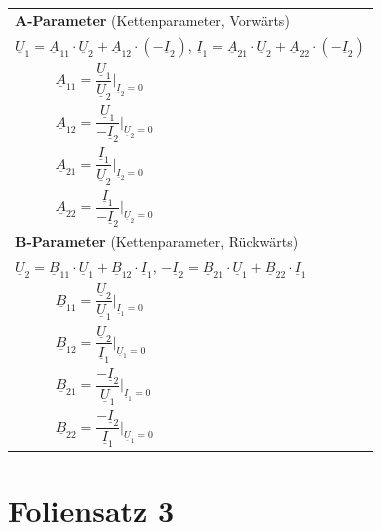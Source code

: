 \documentclass[a4paper,12pt]{scrartcl}
\begin{document}
\begin{tabular}{@{} l l @{}}
\multicolumn{2}{l}{\textbf{A-Parameter} (Kettenparameter, Vorwärts)} \\
\multicolumn{2}{l}{\enspace $\underline{U}_1 = \underline{A}_{11}\cdot\underline{U}_2 + \underline{A}_{12}\cdot(-\underline{I}_2)$, \quad $\underline{I}_1 = \underline{A}_{21}\cdot\underline{U}_2 + \underline{A}_{22}\cdot(-\underline{I}_2)$} \\
\hspace*{20mm} & $\underline{A}_{11} = \dfrac{\underline{U}_1}{\underline{U}_2}\bigg|_{\underline{I}_2=0}$ \\
\hspace*{20mm} & $\underline{A}_{12} = \dfrac{\underline{U}_1}{-\underline{I}_2}\bigg|_{\underline{U}_2=0}$ \\
\hspace*{20mm} & $\underline{A}_{21} = \dfrac{\underline{I}_1}{\underline{U}_2}\bigg|_{\underline{I}_2=0}$ \\
\hspace*{20mm} & $\underline{A}_{22} = \dfrac{\underline{I}_1}{-\underline{I}_2}\bigg|_{\underline{U}_2=0}$ \\[3mm]

\multicolumn{2}{l}{\textbf{B-Parameter} (Kettenparameter, Rückwärts)} \\
\multicolumn{2}{l}{\enspace $\underline{U}_2 = \underline{B}_{11}\cdot\underline{U}_1 + \underline{B}_{12}\cdot\underline{I}_1$, \quad $-\underline{I}_2 = \underline{B}_{21}\cdot\underline{U}_1 + \underline{B}_{22}\cdot\underline{I}_1$} \\
\hspace*{20mm} & $\underline{B}_{11} = \dfrac{\underline{U}_2}{\underline{U}_1}\bigg|_{\underline{I}_1=0}$ \\
\hspace*{20mm} & $\underline{B}_{12} = \dfrac{\underline{U}_2}{\underline{I}_1}\bigg|_{\underline{U}_1=0}$ \\
\hspace*{20mm} & $\underline{B}_{21} = \dfrac{-\underline{I}_2}{\underline{U}_1}\bigg|_{\underline{I}_1=0}$ \\
\hspace*{20mm} & $\underline{B}_{22} = \dfrac{-\underline{I}_2}{\underline{I}_1}\bigg|_{\underline{U}_1=0}$ \\

\end{tabular}

\newpage
\section{Foliensatz 3}
\end{document}
